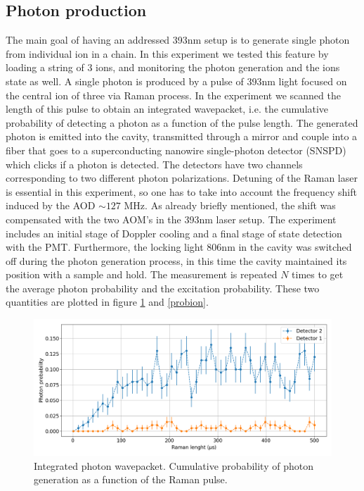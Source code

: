 \subsection{Photon production}
\label{exp:photons}
The main goal of having an addressed 393nm setup is to generate single photon from individual ion in a chain. In this experiment we tested this feature by loading a string of 3 ions, and monitoring the photon generation and the ions state as well. A single photon is produced by a pulse of 393nm light focused on the central ion of three via Raman process. In the experiment we scanned the length of this pulse to obtain an integrated wavepacket, i.e. the cumulative probability of detecting a photon as a function of the pulse length. The generated photon is emitted into the cavity, transmitted through a mirror and couple into a fiber that goes to a superconducting nanowire single-photon detector (SNSPD) which clicks if a photon is detected. The detectors have two channels corresponding to two different photon polarizations. Detuning of the Raman laser is essential in this experiment, so one has to take into account the frequency shift induced by the AOD $\sim 127$ MHz. As already briefly mentioned, the shift was compensated with the two AOM's in the 393nm laser setup. The experiment includes an initial stage of Doppler cooling and a final stage of state detection with the PMT. Furthermore, the locking light 806nm in the cavity was switched off during the photon generation process, in this time the cavity maintained its position with a sample and hold. The measurement is repeated $N$ times to get the average photon probability and the excitation probability. These two quantities are plotted in figure \ref{probphoton} and \ref{probion}.
\begin{figure}[H]
\centering
\includegraphics[width=\textwidth]{img/photonefficency_witherror}
\caption{Integrated photon wavepacket. Cumulative probability of photon generation as a function of the Raman pulse.}
\label{probphoton}
\end{figure}
